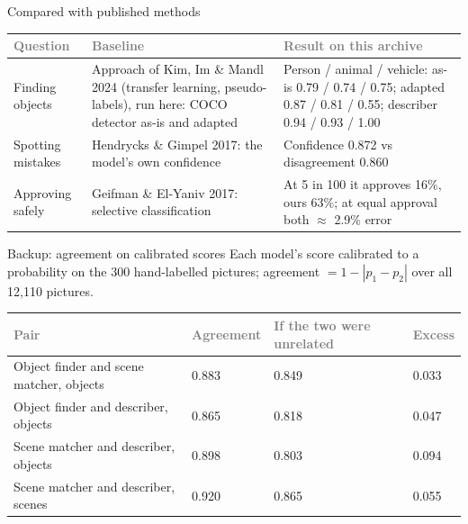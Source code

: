\documentclass[aspectratio=169,11pt]{beamer}
\newcommand{\h}[1]{\textcolor{grey}{#1}}
\newcommand{\remark}[1]{\par\vspace{0.35cm}{\small\textcolor{grey}{#1}}}
\begin{document}
\begin{frame}{Compared with published methods}
\small
\begin{tabular}{@{}L{2.4cm} L{3.6cm} L{6.2cm}@{}}
\toprule
\h{Question} & \h{Baseline} & \h{Result on this archive}\\
\midrule
Finding objects & Approach of Kim, Im \& Mandl 2024 (transfer learning, pseudo-labels), run here: COCO detector as-is and adapted & Person / animal / vehicle: as-is 0.79 / 0.74 / 0.75; adapted 0.87 / 0.81 / 0.55; describer 0.94 / 0.93 / 1.00\\
Spotting mistakes & Hendrycks \& Gimpel 2017: the model's own confidence & Confidence 0.872 vs disagreement 0.860\\
Approving safely & Geifman \& El-Yaniv 2017: selective classification & At 5 in 100 it approves 16\%, ours 63\%; at equal approval both $\approx$ 2.9\% error\\
\bottomrule
\end{tabular}
\remark{Our risk method is not a better ranker; it gives an average guarantee in exchange for more automatic approval.}
\end{frame}

\begin{frame}{Backup: agreement on calibrated scores}
Each model's score calibrated to a probability on the 300 hand-labelled pictures; agreement $= 1 - |p_1 - p_2|$ over all 12,110 pictures.

\vspace{0.3cm}
\begin{tabular}{@{}L{6.0cm} C{1.9cm} C{2.6cm} C{1.4cm}@{}}
\toprule
\h{Pair} & \h{Agreement} & \h{If the two were unrelated} & \h{Excess}\\
\midrule
Object finder and scene matcher, objects & 0.883 & 0.849 & 0.033\\
Object finder and describer, objects & 0.865 & 0.818 & 0.047\\
Scene matcher and describer, objects & 0.898 & 0.803 & 0.094\\
Scene matcher and describer, scenes & 0.920 & 0.865 & 0.055\\
\bottomrule
\end{tabular}
\remark{Most agreement is shared base rates: a rare object is absent almost everywhere, so both models say ``no''. Vehicle: 0.97 against 0.95; person: 0.83 against 0.57.}
\end{frame}
\end{document}
